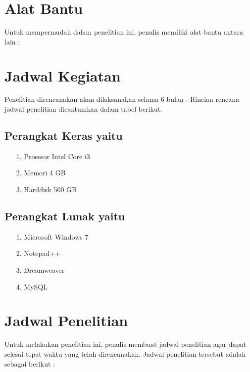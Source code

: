 \documentclass{jtetiproposalskripsi}
\begin{document}
\section{Alat Bantu}

Untuk mempermudah dalam penelitian ini, penulis memiliki alat bantu antara lain :

\section{Jadwal Kegiatan}
Penelitian direncanakan akan dilaksanakan selama 6 bulan . Rincian rencana jadwal penelitian dicantumkan dalam tabel berikut.

\subsection{Perangkat Keras yaitu }

\begin{itemize}
\item[1.]Prosesor Intel Core i3

\item[2.] Memori 4 GB

\item[3.] Harddisk 500 GB
\end{itemize}
\subsection{Perangkat Lunak yaitu }
\begin{itemize}
\item[1.]Microsoft Windows 7 

\item[2.]Notepad++

\item[3.]Dreamweaver

\item[4.]MySQL
\end{itemize}

\section{Jadwal Penelitian}

Untuk melakukan penelitian ini, penulis membuat jadwal penelitian agar dapat selesai tepat waktu yang telah direncanakan. Jadwal penelitian tersebut adalah sebagai berikut :
\end{document}
